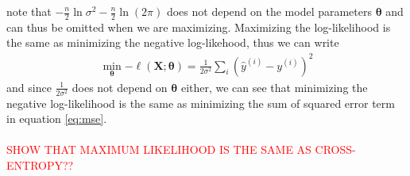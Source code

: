 note that $-\frac{n}{2} \ln \sigma^{2}-\frac{n}{2} \ln (2 \pi)$ does not depend on the model parameters $\boldsymbol{\theta}$ and can thus be omitted when we are maximizing. Maximizing the log-likelihood is the same as minimizing the negative log-likehood, thus we can write 
\begin{equation*}
\begin{split}
        \min_{\boldsymbol{\boldsymbol{\theta}}}{- \ell(\mathbf{X};\boldsymbol{\theta})}=\frac{1}{2 \sigma^{2}} \sum_{i}\left(\hat{y}^{(i)}-y^{(i)}\right)^{2}
\end{split}
\end{equation*}
and since $\frac{1}{2 \sigma^{2}}$ does not depend on $\boldsymbol{\theta}$ either, we can see that minimizing the negative log-likelihood is the same as minimizing the sum of squared error term in equation \ref{eq:mse}.\\
\\
\textcolor{red}{SHOW THAT MAXIMUM LIKELIHOOD IS THE SAME AS CROSS-ENTROPY??}




